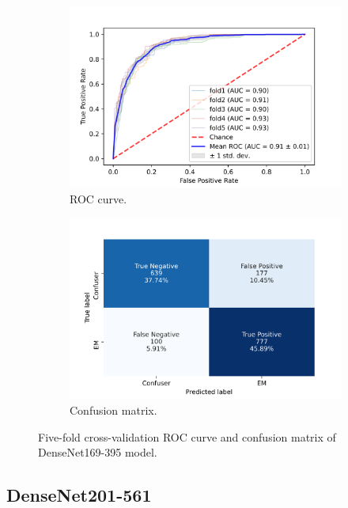 \begin{figure}[h!]
	\centering
	\begin{subfigure}[b]{0.49\textwidth}
		\centering
		\includegraphics[width=\textwidth,keepaspectratio]{images/Supplement4/image130.png}
		\caption{ROC curve.}
	\end{subfigure}
	\hfill
	\begin{subfigure}[b]{0.49\textwidth}
		\centering
		\includegraphics[width=\textwidth,keepaspectratio]{images/Supplement4/image135.png}
		\caption{Confusion matrix.}
	\end{subfigure}
	\caption{Five-fold cross-validation ROC curve and confusion matrix of DenseNet169-395 model.}
\end{figure}

\vfill\clearpage
\subsection{DenseNet201-561}


